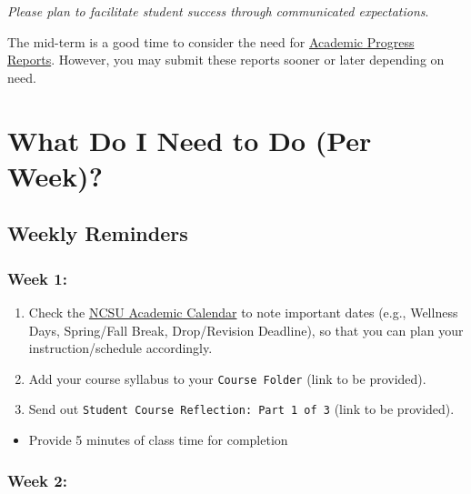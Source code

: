 \documentclass[
]{book}
\providecommand{\tightlist}{%
  \setlength{\itemsep}{0pt}\setlength{\parskip}{0pt}}
\begin{document}
{ \emph{Please plan to facilitate student success through communicated expectations}. }

The mid-term is a good time to consider the need for \href{https://dasa.ncsu.edu/faculty-resources/academic-progress-reporting/}{Academic Progress Reports}. However, you may submit these reports sooner or later depending on need.

\hfill\break

\hypertarget{what-do-i-need-to-do-per-week}{%
\chapter{What Do I Need to Do (Per Week)?}\label{what-do-i-need-to-do-per-week}}

\hypertarget{weekly-reminders}{%
\section{Weekly Reminders}\label{weekly-reminders}}

\hypertarget{week-1}{%
\subsection{Week 1:}\label{week-1}}

\begin{enumerate}
\def\labelenumi{\arabic{enumi})}
\item
  Check the \href{https://studentservices.ncsu.edu/calendars/academic/}{NCSU Academic Calendar} to note important dates (e.g., Wellness Days, Spring/Fall Break, Drop/Revision Deadline), so that you can plan your instruction/schedule accordingly.
\item
  Add your course syllabus to your \texttt{Course\ Folder} (link to be provided).
\item
  Send out \texttt{Student\ Course\ Reflection:\ Part\ 1\ of\ 3} (link to be provided).
\end{enumerate}

\begin{itemize}
\tightlist
\item
  Provide 5 minutes of class time for completion
\end{itemize}

\hypertarget{week-2}{%
\subsection{Week 2:}\label{week-2}}
\end{document}

